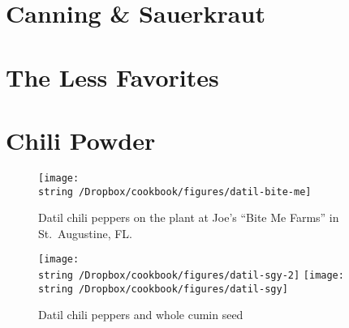 \documentclass[12pt, final]{book}
\begin{document}
\chapter{Canning \& Sauerkraut}

\newpage

\newpage
\chapter{The Less Favorites}\label{chapter3}

\newpage

\newpage

\newpage

\newpage

\newpage

\newpage

\chapter{Chili Powder}








\begin{figure}
\begin{center}
\texttt{[image: \\string~/Dropbox/cookbook/figures/datil-bite-me]}
\end{center}
\caption*{Datil chili peppers on the plant at Joe's ``Bite Me Farms'' in St.\ Augustine, FL.}
\end{figure}
\begin{figure}
\begin{center}
\texttt{[image: \\string~/Dropbox/cookbook/figures/datil-sgy-2]}
\texttt{[image: \\string~/Dropbox/cookbook/figures/datil-sgy]}
\end{center}
\caption*{Datil chili peppers and whole cumin seed}
\end{figure}
\end{document}
